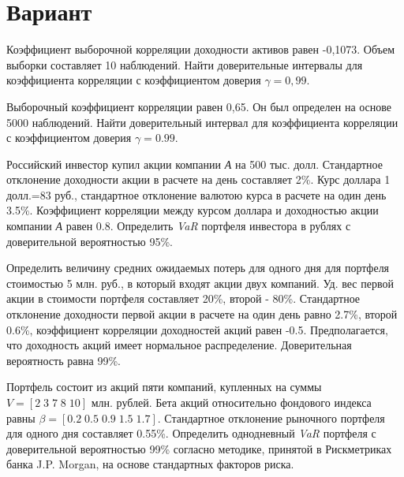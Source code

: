 \documentclass[12pt,a4paper]{article}
\begin{document}
\section{Вариант}
\begin{taskrus}
Коэффициент выборочной корреляции доходности активов равен -0,1073. Объем выборки составляет 10 наблюдений. Найти доверительные интервалы для коэффициента корреляции с коэффициентом доверия $\gamma=0,99$. 
\end{taskrus}

\begin{taskrus}
Выборочный коэффициент корреляции равен 0,65. Он был определен на основе 5000 наблюдений. Найти доверительный интервал для коэффициента корреляции с коэффициентом доверия $\gamma=0.99$.
\end{taskrus}

\begin{taskrus}
Российский инвестор купил акции компании \textit{А} на 500 тыс. долл. Стандартное отклонение доходности акции в расчете на день составляет 2\%. Курс доллара 1 долл.=83 руб., стандартное отклонение валютою курса в расчете на один день 3.5\%. Коэффициент корреляции между курсом доллара и доходностью акции компании \textit{А} равен 0.8. Определить \textit{VaR }портфеля инвестора в рублях с доверительной вероятностью 95\%.
\end{taskrus}

\begin{taskrus} 
Определить величину средних ожидаемых потерь для одного дня для портфеля стоимостью 5 млн. руб., в который входят акции двух компаний. Уд. вес первой акции в стоимости портфеля составляет 20\%, второй - 80\%. Стандартное отклонение доходности первой акции в расчете на один день равно 2.7\%, второй 0.6\%, коэффициент корреляции доходностей акций равен -0.5. Предполагается, что доходность акций имеет нормальное распределение. Доверительная вероятность равна 99\%.
\end{taskrus}


\begin{taskrus}
Портфель состоит из акций пяти компаний, купленных на суммы\newline
{$V=[2\;3\;7\;8\;10]$} млн. рублей. Бета акций относительно фондового индекса равны \newline
{$\beta=[0.2\;0.5\;0.9\;1.5\;1.7]$}. Стандартное отклонение рыночного портфеля для одного дня составляет 0.55\%. Определить однодневный  \textit{VaR }портфеля с доверительной вероятностью 99\% согласно методике, принятой в Рискметриках банка J.P. Morgan, на основе стандартных факторов риска. 
\end{taskrus}
\end{document}
